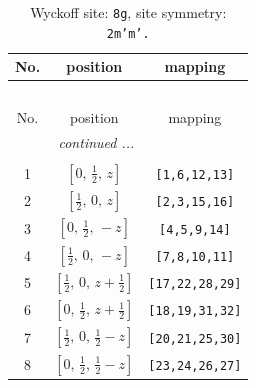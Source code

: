 \documentclass[fleqn,8pt]{jsarticle}
\begin{document}
\begin{longtable}{ccc}
\caption{Wyckoff site: {\tt 8g}, site symmetry: {\tt 2m'm'.}}
 \\
 \hline \hline
No. & position & mapping \\ \hline \endfirsthead

\multicolumn{2}{l}{\tablename\ \thetable{}} \\
 \hline \hline
No. & position & mapping \\ \hline \endhead

 \hline \hline
\multicolumn{2}{r}{\footnotesize\it continued ...} \\ \endfoot

 \hline \hline
\multicolumn{2}{r}{} \\ \endlastfoot

1 & $\left[ 0,\, \frac{1}{2},\, z \right]$ & {\tt [1,6,12,13]} \\ \hline
2 & $\left[ \frac{1}{2},\, 0,\, z \right]$ & {\tt [2,3,15,16]} \\ \hline
3 & $\left[ 0,\, \frac{1}{2},\, - z \right]$ & {\tt [4,5,9,14]} \\ \hline
4 & $\left[ \frac{1}{2},\, 0,\, - z \right]$ & {\tt [7,8,10,11]} \\ \hline
5 & $\left[ \frac{1}{2},\, 0,\, z + \frac{1}{2} \right]$ & {\tt [17,22,28,29]} \\ \hline
6 & $\left[ 0,\, \frac{1}{2},\, z + \frac{1}{2} \right]$ & {\tt [18,19,31,32]} \\ \hline
7 & $\left[ \frac{1}{2},\, 0,\, \frac{1}{2} - z \right]$ & {\tt [20,21,25,30]} \\ \hline
8 & $\left[ 0,\, \frac{1}{2},\, \frac{1}{2} - z \right]$ & {\tt [23,24,26,27]} \\
\end{longtable}
\renewcommand{\arraystretch}{1.2}
\end{document}
